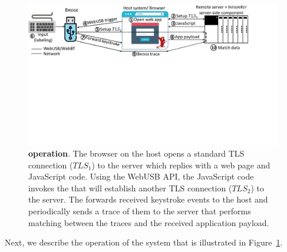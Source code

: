 %
%
\begin{figure}[t]
 \centering
  \includegraphics[trim={0 11cm 4cm 0},clip,width=0.95\linewidth]{chapters/IntegriKey/images/SystemDesign_forms_revised_5.pdf}
 \caption{\textbf{\name operation}. The browser on the host opens a standard TLS connection ($TLS_1$) to the server which replies with a web page and JavaScript code. Using the WebUSB API, the JavaScript code invokes the \device that will establish another TLS connection ($TLS_2$) to the server. The \device forwards received keystroke events to the host and periodically sends a trace of them to the server that performs matching between the traces and the received application payload.}
 \vspace{-10pt}
 \label{fig:systemDesignForms}
\end{figure}

Next, we describe the operation of the \name system that is illustrated in Figure~\ref{fig:systemDesignForms}. 

